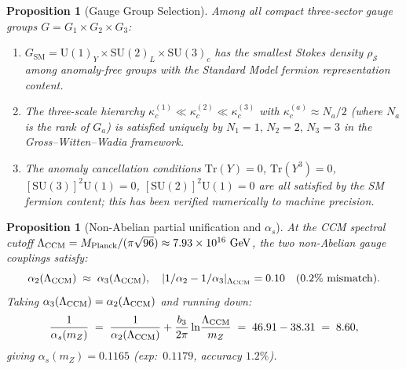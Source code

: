 \documentclass[12pt]{article}
\newtheorem{proposition}[theorem]{Proposition}
\theoremstyle{definition}
\theoremstyle{remark}
\newcommand{\SU}{\mathrm{SU}}
\newcommand{\U}{\mathrm{U}}
\newcommand{\Tr}{\mathrm{Tr}}
\newcommand{\SM}{\mathrm{SM}}
\begin{document}
\begin{proposition}[Gauge Group Selection]\label{prop:selection}
Among all compact three-sector gauge groups $G = G_1 \times G_2 \times G_3$:
\begin{enumerate}
\item[\textup{(a)}] $G_\SM = \U(1)_Y \times \SU(2)_L \times \SU(3)_c$ has
  the smallest Stokes density $\rho_\mathcal{S}$ among anomaly-free groups
  with the Standard Model fermion representation content.
\item[\textup{(b)}] The three-scale hierarchy
  $\kappa_c^{(1)} \ll \kappa_c^{(2)} \ll \kappa_c^{(3)}$
  with $\kappa_c^{(a)} \approx N_a/2$ (where $N_a$ is the rank of $G_a$)
  is satisfied uniquely by $N_1 = 1,\, N_2 = 2,\, N_3 = 3$ in
  the Gross--Witten--Wadia framework.
\item[\textup{(c)}] The anomaly cancellation conditions $\Tr(Y) = 0$,
  $\Tr(Y^3) = 0$, $[\SU(3)]^2\U(1) = 0$, $[\SU(2)]^2\U(1) = 0$
  are all satisfied by the SM fermion content; this has been
  verified numerically to machine precision.
\end{enumerate}
\end{proposition}

\begin{proposition}[Non-Abelian partial unification and $\alpha_s$]
\label{prop:alpha_s}
At the CCM spectral cutoff $\Lambda_{\rm CCM} = M_{\rm Planck}/(\pi\sqrt{96})
\approx 7.93\times 10^{16}\ \mathrm{GeV}$, the two non-Abelian gauge couplings satisfy:
\begin{equation}
  \alpha_2(\Lambda_{\rm CCM}) \;\approx\; \alpha_3(\Lambda_{\rm CCM}),
  \quad
  |1/\alpha_2 - 1/\alpha_3|_{\Lambda_{\rm CCM}} = 0.10 \quad (0.2\%\ \text{mismatch}).
\end{equation}
Taking $\alpha_3(\Lambda_{\rm CCM}) = \alpha_2(\Lambda_{\rm CCM})$ and running down:
\begin{equation}
  \frac{1}{\alpha_s(m_Z)} \;=\; \frac{1}{\alpha_2(\Lambda_{\rm CCM})}
    + \frac{b_3}{2\pi}\ln\!\frac{\Lambda_{\rm CCM}}{m_Z}
  \;=\; 46.91 - 38.31 \;=\; 8.60,
\end{equation}
giving $\alpha_s(m_Z) = 0.1165$ (exp:\ $0.1179$, accuracy $1.2\%$).
\end{proposition}
\end{document}
